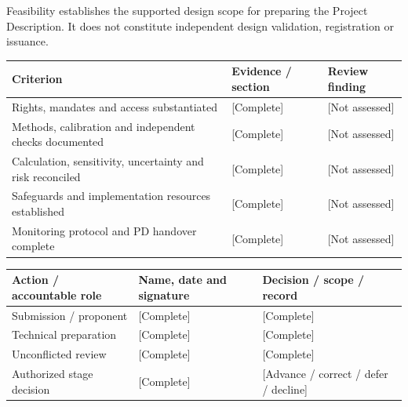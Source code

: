 \begin{Notice}Feasibility establishes the supported design scope for preparing the Project Description. It does not constitute independent design validation, registration or issuance.\end{Notice}
{\sffamily\fontsize{8.3}{10.3}\selectfont\begin{longtable}{@{}P{80.84mm} P{42.89mm} P{41.24mm}@{}}
\toprule
\textbf{Criterion} & \textbf{Evidence / section} & \textbf{Review finding}\\\midrule\endhead
\rule{0pt}{7.7mm}Rights, mandates and access substantiated & [Complete] & [Not assessed]\\\hline
\rule{0pt}{7.7mm}Methods, calibration and independent checks documented & [Complete] & [Not assessed]\\\hline
\rule{0pt}{7.7mm}Calculation, sensitivity, uncertainty and risk reconciled & [Complete] & [Not assessed]\\\hline
\rule{0pt}{7.7mm}Safeguards and implementation resources established & [Complete] & [Not assessed]\\\hline
\rule{0pt}{7.7mm}Monitoring protocol and PD handover complete & [Complete] & [Not assessed]\\\hline
\end{longtable}}
{\sffamily\fontsize{8.3}{10.3}\selectfont\begin{longtable}{@{}P{51.14mm} P{56.09mm} P{57.74mm}@{}}
\toprule
\textbf{Action / accountable role} & \textbf{Name, date and signature} & \textbf{Decision / scope / record}\\\midrule\endhead
\rule{0pt}{7.7mm}Submission / proponent & [Complete] & [Complete]\\\hline
\rule{0pt}{7.7mm}Technical preparation & [Complete] & [Complete]\\\hline
\rule{0pt}{7.7mm}Unconflicted review & [Complete] & [Complete]\\\hline
\rule{0pt}{7.7mm}Authorized stage decision & [Complete] & [Advance / correct / defer / decline]\\\hline
\end{longtable}}

